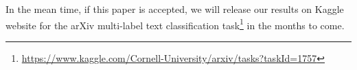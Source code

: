 \vspace{\baselineskip}

In the mean time, if this paper is accepted, we will release our results on Kaggle website for the arXiv multi-label text classification task\footnote{\url{https://www.kaggle.com/Cornell-University/arxiv/tasks?taskId=1757}} in the months to come.




